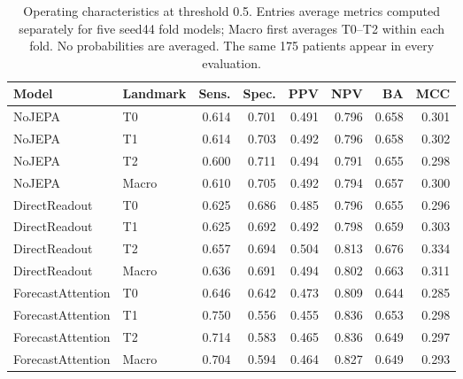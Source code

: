 \begin{table}[t]
\centering
\small
\caption{Operating characteristics at threshold 0.5. Entries average metrics computed separately for five seed44 fold models; Macro first averages T0--T2 within each fold. No probabilities are averaged. The same 175 patients appear in every evaluation.}
\label{tab:extended_operating}
\begin{tabular}{llrrrrrr}
\toprule
Model & Landmark & Sens. & Spec. & PPV & NPV & BA & MCC \\
\midrule
NoJEPA & T0 & 0.614 & 0.701 & 0.491 & 0.796 & 0.658 & 0.301 \\
NoJEPA & T1 & 0.614 & 0.703 & 0.492 & 0.796 & 0.658 & 0.302 \\
NoJEPA & T2 & 0.600 & 0.711 & 0.494 & 0.791 & 0.655 & 0.298 \\
NoJEPA & Macro & 0.610 & 0.705 & 0.492 & 0.794 & 0.657 & 0.300 \\
\midrule
DirectReadout & T0 & 0.625 & 0.686 & 0.485 & 0.796 & 0.655 & 0.296 \\
DirectReadout & T1 & 0.625 & 0.692 & 0.492 & 0.798 & 0.659 & 0.303 \\
DirectReadout & T2 & 0.657 & 0.694 & 0.504 & 0.813 & 0.676 & 0.334 \\
DirectReadout & Macro & 0.636 & 0.691 & 0.494 & 0.802 & 0.663 & 0.311 \\
\midrule
ForecastAttention & T0 & 0.646 & 0.642 & 0.473 & 0.809 & 0.644 & 0.285 \\
ForecastAttention & T1 & 0.750 & 0.556 & 0.455 & 0.836 & 0.653 & 0.298 \\
ForecastAttention & T2 & 0.714 & 0.583 & 0.465 & 0.836 & 0.649 & 0.297 \\
ForecastAttention & Macro & 0.704 & 0.594 & 0.464 & 0.827 & 0.649 & 0.293 \\
\bottomrule
\end{tabular}
\end{table}

